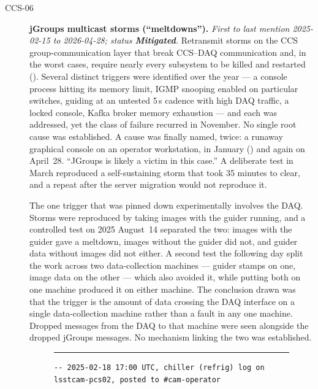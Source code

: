 \begin{description}
\item[CCS-06]\label{iss:CCS-06} \textbf{jGroups multicast storms (``meltdowns'').}
  \emph{First to last mention 2025-02-15 to 2026-04-28; status \textcolor{stmit}{\textbf{Mitigated}}.}
  Retransmit storms on the CCS group-communication layer that break CCS--DAQ communication and, in the worst cases, require nearly every subsystem to be killed and restarted ().  Several distinct triggers were identified over the year --- a console process hitting its memory limit, IGMP snooping enabled on particular switches, guiding at an untested 5\,s cadence with high DAQ traffic, a locked console, Kafka broker memory exhaustion --- and each was addressed, yet the class of failure recurred in November.  No single root cause was established.  A cause was finally named, twice: a runaway graphical console on an operator workstation, in January () and again on April~28.  ``JGroups is likely a victim in this case.''  A deliberate test in March reproduced a self-sustaining storm that took 35 minutes to clear, and a repeat after the server migration would not reproduce it.

  The one trigger that was pinned down experimentally involves the DAQ.  Storms were reproduced by taking images with the guider running, and a controlled test on 2025 August~14 separated the two: images with the guider gave a meltdown, images without the guider did not, and guider data without images did not either.  A second test the following day split the work across two data-collection machines --- guider stamps on one, image data on the other --- which also avoided it, while putting both on one machine produced it on either machine.  The conclusion drawn was that the trigger is the amount of data crossing the DAQ interface on a single data-collection machine rather than a fault in any one machine.  Dropped messages from the DAQ to that machine were seen alongside the dropped jGroups messages.  No mechanism linking the two was established.

\begin{figure}[H]
\centering
\begin{minipage}{\textwidth}
\hrule\vspace{4pt}
\begingroup\scriptsize
\begin{verbatim}
-- 2025-02-18 17:00 UTC, chiller (refrig) log on lsstcam-pcs02, posted to #cam-operator


\end{verbatim}
\end{minipage}
\end{figure}
\end{description}
